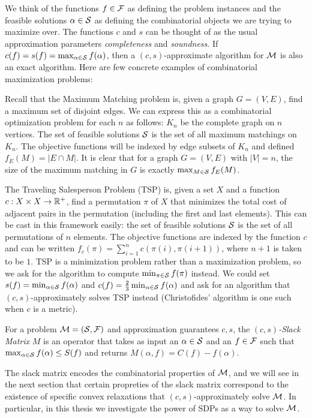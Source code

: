 We think of the functions $f \in \mathcal F$ as defining the problem instances and the feasible solutions $\alpha \in \mathcal S$ as defining the combinatorial objects we are 
trying to maximize over. The functions $c$ and $s$ can be thought of as the usual approximation parameters \emph{completeness} and \emph{soundness}. If $c(f) = s(f) = \max_{\alpha \in \mathcal S} f(\alpha)$, then a $(c,s)$-approximate algorithm for $\mathcal M$ is also an exact algorithm. Here are few concrete examples of combinatorial maximization problems:
\begin{example}
Recall that the Maximum Matching problem is, given a graph $G = (V,E)$, find a maximum set of disjoint edges. We can express this as a combinatorial optimization problem for each $n$ as follows: $K_n$ be the complete graph on $n$ vertices. The set of feasible solutions $\mathcal S$ is the set of all maximum matchings on $K_n$. The objective functions will be indexed by edge subsets of $K_n$ and defined $f_E(M) = |E \cap M|$. It is clear that for a graph $G = (V, E)$ with $|V| = n$, the size of the maximum matching in $G$ is exactly $\max_{M \in \mathcal S} f_E(M)$.
\end{example}
\begin{example}
The Traveling Salesperson Problem (\textsc{TSP}) is, given a set $X$ and a function $c: X\times X \rightarrow \mathbb R^+$, find a permutation $\pi$ of $X$ that minimizes the total cost of adjacent pairs in the permutation (including the first and last elements). This can be cast in this framework easily: the set of feasible solutions $\mathcal S$ is the set of all permutations of $n$ elements. The objective functions are indexed by the function $c$ and can be written $f_c(\pi) = \sum_{i=1}^n c(\pi(i),\pi(i+1))$, where $n+1$ is taken to be $1$. TSP is a minimization problem rather than a maximization problem, so we ask for the algorithm to compute $\min_{\pi \in \mathcal S} f(\pi)$ instead. We could set $s(f) = \min_{\alpha \in \mathcal S} f(\alpha)$ and $c(f) = \frac{2}{3}\min_{\alpha \in \mathcal S} f(\alpha)$ and ask for an algorithm that $(c,s)$-approximately solves \textsc{TSP} instead (Christofides' algorithm \cite{Chri76} is one such when $c$ is a metric). 
\end{example}
\begin{definition}
For a problem $\mathcal M = (\mathcal S, \mathcal F)$ and approximation guarantees $c,s$, the \emph{$(c,s)$-Slack Matrix} $M$ is an operator that takes as input an $\alpha \in \mathcal S$ and an $f \in \mathcal F$ such that $\max_{\alpha \in \mathcal S} f(\alpha) \leq S(f)$ and returns $M(\alpha,f) = C(f) - f(\alpha)$. 
\end{definition}
The slack matrix encodes the combinatorial properties of $\mathcal M$, and we will see in the next section that certain propreties of the slack matrix correspond to the existence of specific convex relaxations that $(c,s)$-approximately solve $\mathcal M$. In particular, in this thesis we investigate the power of SDPs as a way to solve $\mathcal M$. 


